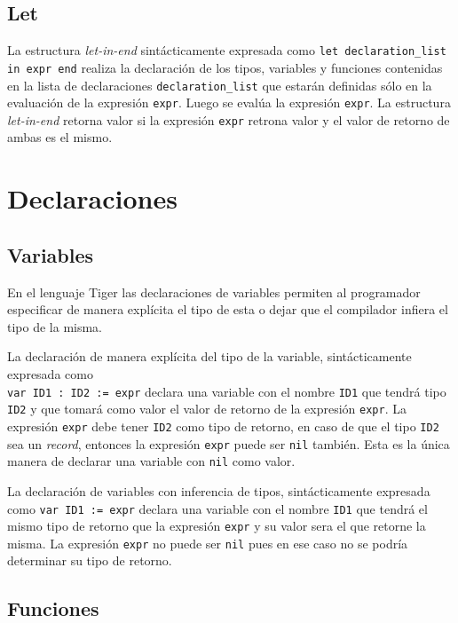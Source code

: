 \documentclass{article}
\begin{document}
\subsection{Let}

La estructura \emph{let-in-end} sintácticamente expresada como
\verb|let declaration_list in expr end| realiza la declaración de los tipos,
variables y funciones contenidas en la lista de declaraciones
\verb|declaration_list| que estarán definidas sólo en la evaluación de la
expresión \verb|expr|. Luego se evalúa la expresión \verb|expr|. La estructura
\emph{let-in-end} retorna valor si la expresión \verb|expr| retrona valor y el
valor de retorno de ambas es el mismo.

\section{Declaraciones}

\subsection{Variables}

En el lenguaje Tiger las declaraciones de variables permiten al programador
especificar de manera explícita el tipo de esta o dejar que el compilador
infiera el tipo de la misma.

La declaración de manera explícita del tipo de la variable, sintácticamente expresada como \\
\verb|var ID1 : ID2 := expr| declara una variable con el nombre \verb|ID1| que
tendrá tipo \verb|ID2| y que tomará como valor el valor de retorno de la expresión
\verb|expr|. La expresión \verb|expr| debe tener \verb|ID2| como tipo de retorno,
en caso de que el tipo \verb|ID2| sea un \emph{record}, entonces la expresión \verb|expr|
puede ser \verb|nil| también. Esta es la única manera de declarar una variable con
\verb|nil| como valor.

La declaración de variables con inferencia de tipos, sintácticamente expresada
como \verb|var ID1 := expr|  declara una variable con el nombre \verb|ID1| que
tendrá el mismo tipo de retorno que la expresión \verb|expr| y su valor sera el
que retorne la misma. La expresión \verb|expr| no puede ser \verb|nil| pues en
ese caso no se podría determinar su tipo de retorno.

\subsection{Funciones}
\end{document}
